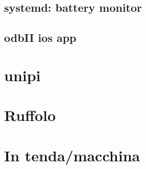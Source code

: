 \section{systemd: battery monitor}

\section{odbII ios app}

\chapter{unipi}

\chapter{Ruffolo}

\chapter{In tenda/macchina}